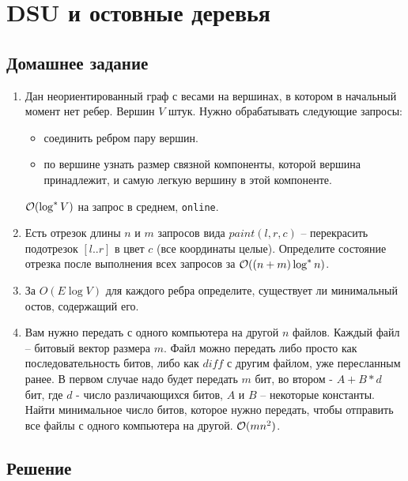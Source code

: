 \section{DSU и остовные деревья}

\subsection{Домашнее задание}
\begin{enumerate}
  \item
    Дан неориентированный граф с весами на вершинах, в котором в начальный момент нет ребер.
    Вершин $V$ штук. Нужно обрабатывать следующие запросы:
    \begin{itemize}
      \item соединить ребром пару вершин.
      \item по вершине узнать размер связной компоненты, которой вершина принадлежит, и самую
            легкую вершину в этой компоненте.
    \end{itemize}
    $\mathcal{O}(\log^* V)$ на запрос в среднем, \texttt{online}.

  \item
    Есть отрезок длины $n$ и $m$ запросов вида $paint(l, r, c)$ -- перекрасить подотрезок $[l..r]$ в цвет $c$ (все координаты целые).
    Определите состояние отрезка после выполнения всех запросов за $\mathcal{O}((n + m)\log^*n)$.

  \item
    За $O(E \log V)$ для каждого ребра определите, существует ли минимальный остов, содержащий его.

  \item
    Вам нужно передать с одного компьютера на другой $n$ файлов. Каждый файл -- битовый вектор
    размера $m$. Файл можно передать либо просто как последовательность битов, либо как $diff$
    с другим файлом, уже пересланным ранее. В первом случае надо будет передать $m$ бит, во
    втором - $A+B*d$ бит, где $d$ - число различающихся битов, $A$ и $B$ -- некоторые
    константы. Найти минимальное число битов, которое нужно передать, чтобы отправить все
    файлы с одного компьютера на другой. $\mathcal{O}(mn^2)$.

\end{enumerate}

\newpage
\subsection{Решение}


